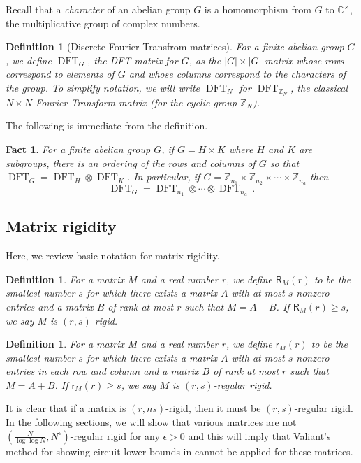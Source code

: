 \documentclass{toc}
\newtheorem{define}[theorem]{Definition}
\newtheorem{fact.}[theorem]{Fact}
\renewcommand\Z{{\mathbb{Z}}}
\renewcommand\C{{\mathbb{C}}}
\DeclareMathOperator{\DFT}{DFT}
\begin{document}
%
%
%
Recall that a \emph{character} of an abelian group $G$ is a
homomorphism from $G$ to $\C^{\times}$, the multiplicative group
of complex numbers.   %
\begin{define}[Discrete Fourier Transfrom matrices] %
For a finite abelian group $G$, we
%
define $\DFT_G$, the DFT matrix for $G$, %
as the $|G| \times |G|$ matrix whose rows correspond to elements of $G$ and
whose columns correspond to the characters of the group. %
To simplify notation, we will write 
$\DFT_N$ for %
$\DFT_{\Z_N}$, the classical $N\times N$ Fourier Transform matrix  %
(for the cyclic group $\Z_N$).  %
%
\end{define}
The following is immediate from the definition. %
\begin{fact.}\label{fact:dftproduct}
%
For a finite abelian group $G$, if $G = H \times K$ where $H$ and $K$ are
%
subgroups,   %
there is an ordering of the rows and columns of $G$ so that $\DFT_G = \DFT_H \otimes \DFT_K$.  In particular, if $G = \Z_{n_1} \times \Z_{n_2} \times \cdots \times \Z_{n_a}$ then 
$$\DFT_G = \DFT_{n_1} \otimes \cdots \otimes \DFT_{n_a}\,.$$
\end{fact.}
%
%
%
%
%
%
%
%
%
%
%
%
%
%


%
\subsection{Matrix rigidity}    %
Here, we review basic notation for matrix rigidity.
\begin{define}
For a matrix $M$ and a real number $r$, we define $\textsf{R}_M(r)$ to be the smallest number $s$ for which there exists a matrix $A$ with at most $s$ nonzero entries and a matrix $B$ of rank at most $r$ such that $M = A+B$.  If $\textsf{R}_M(r) \geq s$, we say $M$ is $(r,s)$-rigid.
\end{define}


\begin{define}
For a matrix $M$ and a real number $r$, we define $\textsf{r}_M(r)$ to be the smallest number $s$ for which there exists a matrix $A$ with at most $s$ nonzero entries in each row and column and a matrix $B$ of rank at most $r$ such that $M = A+B$.  If $\textsf{r}_M(r) \geq s$, we say $M$ is $(r,s)$-regular rigid.
\end{define}
It is clear that if a matrix is $(r,ns)$-rigid, then it must be $(r,s)$-regular rigid.  In
%
the following  %
sections, we will show that various matrices are not $(\frac{N}{\log \log N}, N^{\epsilon})$-regular rigid for any $\epsilon >0$ and this will imply that Valiant's method for showing circuit lower bounds in \cite{rigidity} cannot be applied for these matrices.
\end{document}
